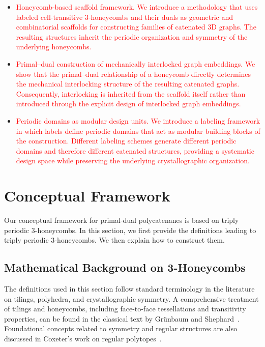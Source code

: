 \documentclass[times,twocolumn,final]{elsarticle}
\begin{document}
\begin{itemize}
\item \textcolor{red}{Honeycomb-based scaffold framework. We introduce a methodology that uses labeled cell-transitive 3-honeycombs and their duals as geometric and combinatorial scaffolds for constructing families of catenated 3D graphs. The resulting structures inherit the periodic organization and symmetry of the underlying honeycombs.}
\item \textcolor{red}{Primal--dual construction of mechanically interlocked graph embeddings. We show that the primal--dual relationship of a honeycomb directly determines the mechanical interlocking structure of the resulting catenated graphs. Consequently, interlocking is inherited from the scaffold itself rather than introduced through the explicit design of interlocked graph embeddings.}
\item \textcolor{red}{Periodic domains as modular design units. We introduce a labeling framework in which labels define periodic domains that act as modular building blocks of the construction. Different labeling schemes generate different periodic domains and therefore different catenated structures, providing a systematic design space while preserving the underlying crystallographic organization.}
\end{itemize}

\section{Conceptual Framework}

Our conceptual framework for primal-dual polycatenanes is based on triply periodic 3-honeycombs. In this section, we first provide the definitions leading to triply periodic 3-honeycombs. We then explain how to construct them. 

\subsection{Mathematical Background on 3-Honeycombs}

The definitions used in this section follow standard terminology in the literature on tilings, polyhedra, and crystallographic symmetry.
A comprehensive treatment of tilings and honeycombs, including face-to-face tessellations and transitivity properties, can be found in the classical text by Gr\"unbaum and Shephard~\cite{grunbaum1969convex,grunbaum1987tilings,grunbaum1994uniform}. Foundational concepts related to symmetry and regular structures are also discussed in Coxeter's work on regular polytopes~\cite{coxeter1973regular,williams1979geometrical}.
\end{document}
